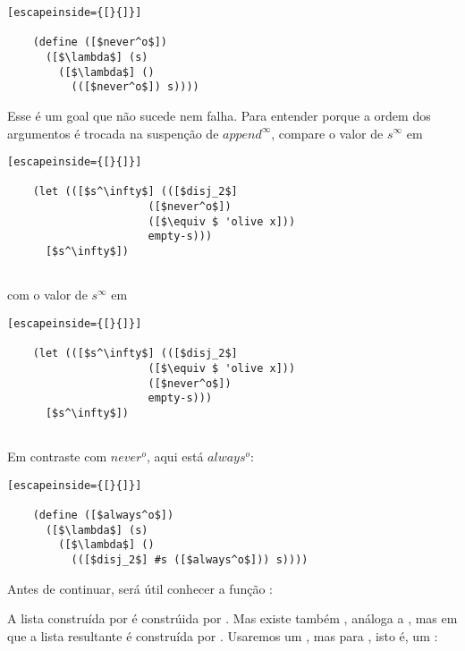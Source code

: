   \begin{lstlisting}[escapeinside={[}{]}]

    (define ([$never^o$])
      ([$\lambda$] (s)
        ([$\lambda$] ()
          (([$never^o$]) s))))

  \end{lstlisting}

  \noindent Esse é um goal que não sucede nem falha. Para entender
  porque a ordem dos argumentos é trocada na suspenção de $append^\infty$,
  compare o valor de $s^\infty$ em

  \begin{lstlisting}[escapeinside={[}{]}]

    (let (([$s^\infty$] (([$disj_2$]
                      ([$never^o$])
                      ([$\equiv $ 'olive x]))
                      empty-s)))
      [$s^\infty$])
                      
  \end{lstlisting}

  \noindent com o valor de $s^\infty$ em

  \begin{lstlisting}[escapeinside={[}{]}]

    (let (([$s^\infty$] (([$disj_2$]
                      ([$\equiv $ 'olive x]))
                      ([$never^o$])
                      empty-s)))
      [$s^\infty$])
                      
  \end{lstlisting}

  Em contraste com $never^o$, aqui está $always^o$:

  \begin{lstlisting}[escapeinside={[}{]}]

    (define ([$always^o$])
      ([$\lambda$] (s)
        ([$\lambda$] ()
          (([$disj_2$] #s ([$always^o$])) s))))

  \end{lstlisting}

  Antes de continuar, será útil conhecer a função :\\
   \seta {}

  \noindent A lista construída por  é constrúida por
  . Mas existe também , análoga
  a , mas em que a lista resultante é construída por
  . Usaremos um , mas para
  , isto é, um :

